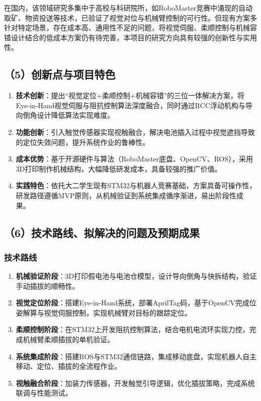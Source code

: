 \documentclass[a4paper,12pt]{ctexart}
\begin{document}
在国内，该领域研究多集中于高校与科研院所，如RoboMaster竞赛中涌现的自动取矿、物资投送等技术，已验证了视觉对位与机械臂控制的可行性。但现有方案多针对特定场景，存在成本高、通用性不足的问题，将视觉伺服、柔顺控制与机械容错设计结合的低成本方案仍有待完善，本项目的研究方向具有较强的创新性与实用性。

\subsection*{（5）创新点与项目特色}
\begin{enumerate}[label=\arabic*.]
    \item \textbf{技术创新}：提出“视觉定位+柔顺控制+机械容错”的三位一体解决方案，将Eye-in-Hand视觉伺服与阻抗控制算法深度融合，同时通过RCC浮动机构与导向倒角设计降低算法实现难度。
    \item \textbf{功能创新}：引入触觉传感器实现视触融合，解决电池插入过程中视觉遮挡导致的定位失效问题，提升系统作业的鲁棒性。
    \item \textbf{成本优势}：基于开源硬件与算法（RoboMaster底盘、OpenCV、ROS），采用3D打印制作机械结构，大幅降低研发成本，具备较强的推广价值。
    \item \textbf{实践特色}：依托大二学生现有STM32与机器人竞赛基础，方案具备可操作性，研发路径遵循MVP原则，从机械验证到系统集成循序渐进，易出阶段性成果。
\end{enumerate}

\subsection*{（6）技术路线、拟解决的问题及预期成果}
\subsubsection*{技术路线}
\begin{enumerate}[label=\arabic*.]
    \item \textbf{机械验证阶段}：3D打印假电池与电池仓模型，设计导向倒角与快拆结构，验证手动插拔的顺畅性。
    \item \textbf{视觉定位阶段}：搭建Eye-in-Hand系统，部署AprilTag码，基于OpenCV完成位姿解算与视觉伺服控制，实现机械臂对目标的跟踪定位。
    \item \textbf{柔顺控制阶段}：在STM32上开发阻抗控制算法，结合电机电流环实现力控，完成机械臂柔顺插拔的单机验证。
    \item \textbf{系统集成阶段}：搭建ROS与STM32通信链路，集成移动底盘，实现机器人自主移动、定位、插拔的全流程作业。
    \item \textbf{视触融合阶段}：加装力传感器，开发触觉引导逻辑，优化插拔策略，完成系统联调与性能测试。
\end{enumerate}
\end{document}
